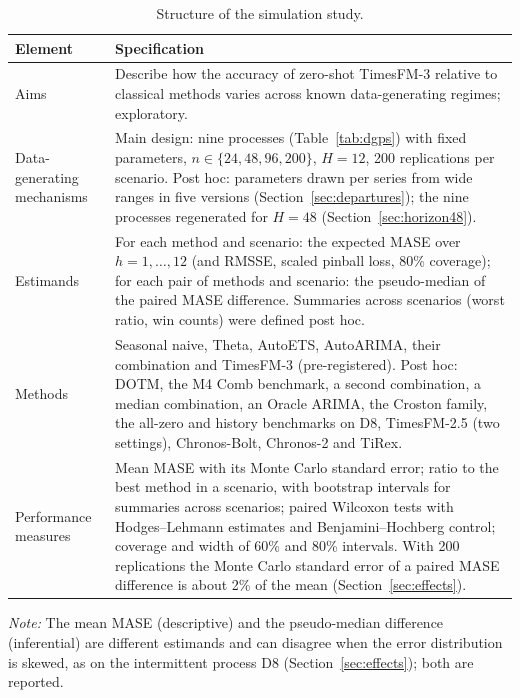 \documentclass[ASNA]{USG}
\providecommand{\sectionref}[1]{Section~\ref{#1}}
\providecommand{\tableref}[1]{Table~\ref{#1}}
\begin{document}
\begin{table}[!htbp]
\centering
\begin{threeparttable}
\caption{Structure of the simulation study.}
\label{tab:ademp}
\small
\begin{tabular}{>{\raggedright\arraybackslash}p{2.6cm}>{\raggedright\arraybackslash}p{11.4cm}}
\toprule
Element & Specification \\
\midrule
Aims & Describe how the accuracy of zero-shot TimesFM-3 relative to classical methods varies across
  known data-generating regimes; exploratory. \\[2pt]
Data-generating mechanisms & Main design: nine processes (\tableref{tab:dgps}) with fixed
  parameters, $n \in \{24, 48, 96, 200\}$, $H = 12$, 200 replications per scenario. Post hoc: parameters drawn
  per series from wide ranges in five versions (\sectionref{sec:departures}); the nine processes
  regenerated for $H = 48$ (\sectionref{sec:horizon48}). \\[2pt]
Estimands & For each method and scenario: the expected MASE over $h = 1, \dots, 12$ (and RMSSE, scaled
  pinball loss, 80\% coverage); for each pair of methods and scenario: the pseudo-median of the paired
  MASE difference. Summaries across scenarios (worst ratio, win counts) were defined post hoc. \\[2pt]
Methods & Seasonal naive, Theta, AutoETS, AutoARIMA, their combination and TimesFM-3 (pre-registered).
  Post hoc: DOTM, the M4 Comb benchmark, a second combination, a median combination, an Oracle ARIMA, the
  Croston family, the all-zero and history benchmarks on D8, TimesFM-2.5 (two settings), Chronos-Bolt,
  Chronos-2 and TiRex. \\[2pt]
Performance measures & Mean MASE with its Monte Carlo standard error; ratio to the best method in
  a scenario, with bootstrap intervals for summaries across scenarios; paired Wilcoxon tests with
  Hodges--Lehmann estimates and Benjamini--Hochberg control; coverage and width of 60\% and 80\%
  intervals. With 200 replications the Monte Carlo standard error of a paired MASE difference is about
  2\% of the mean (\sectionref{sec:effects}). \\
\bottomrule
\end{tabular}
\begin{tablenotes}[flushleft]\footnotesize
\item \textit{Note:} The mean MASE (descriptive) and the pseudo-median difference (inferential)
are different estimands and can disagree when the error distribution is skewed, as on the
intermittent process D8 (\sectionref{sec:effects}); both are reported.
\end{tablenotes}
\end{threeparttable}
\end{table}
\end{document}
